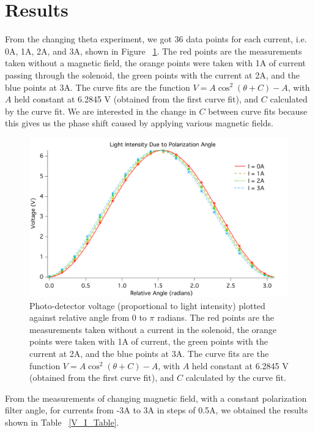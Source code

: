 \documentclass[prb,preprint]{revtex4-1}
\begin{document}
\section{Results}

From the changing theta experiment, we got 36 data points for each current, i.e. 0A, 1A, 2A, and 3A, shown in Figure ~\ref{V_ThetaRel_Plot}. The red points are the measurements taken without a magnetic field, the orange points were taken with 1A of current passing through the solenoid, the green points with the current at 2A, and the blue points at 3A.  The curve fits are the function $V = A \cos^{2}(\theta + C) - A$, with $A$ held constant at 6.2845 V (obtained from the first curve fit), and $C$ calculated by the curve fit. We are interested in the change in $C$ between curve fits because this gives us the phase shift caused by applying various magnetic fields.

\begin{figure}[h!]
\centering
\includegraphics[width=6in]{V_ThetaRel_Plot.pdf}
\caption{Photo-detector voltage (proportional to light intensity) plotted against relative angle from 0 to $\pi$ radians.  The red points are the measurements taken without a current in the solenoid, the orange points were taken with 1A of current, the green points with the current at 2A, and the blue points at 3A.  The curve fits are the function $V = A \cos^{2}(\theta + C) - A$, with $A$ held constant at 6.2845 V (obtained from the first curve fit), and $C$ calculated by the curve fit. }
\label{V_ThetaRel_Plot}
\end{figure}

From the measurements of changing magnetic field, with a constant polarization filter angle, for currents from -3A to 3A in steps of 0.5A, we obtained the results shown in Table ~\ref{V_I_Table}. 
\end{document}
